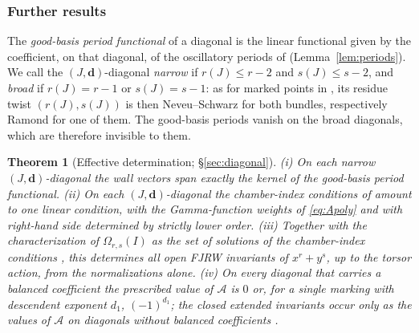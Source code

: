 \documentclass[11pt]{amsart}
\newtheorem{theorem}{Theorem}[section]
\theoremstyle{definition}
\theoremstyle{remark}
\newcommand{\Ascr}{\mathcal{A}}
\newcommand{\Om}{\Omega_{r,s}}
\begin{document}
\subsubsection*{Further results}
The \emph{good-basis period functional} of a diagonal is the linear functional
given by the coefficient, on that diagonal, of the oscillatory periods of
\cite[Thm.~0.3]{GKT} (Lemma~\ref{lem:periods}).  We call the
$(J,\mathbf d)$-diagonal \emph{narrow} if $r(J)\le r-2$ and $s(J)\le s-2$, and
\emph{broad} if $r(J)=r-1$ or $s(J)=s-1$: as for marked points in
\cite[\S1.1]{GKT}, its residue twist $(r(J),s(J))$ is then Neveu--Schwarz for
both bundles, respectively Ramond for one of them.  The good-basis periods
vanish on the broad diagonals, which are therefore invisible to them.

\begin{theorem}[Effective determination; \S\ref{sec:diagonal}]
\label{thm:effective}
(i) On each narrow $(J,\mathbf d)$-diagonal the wall vectors span exactly
the kernel of the good-basis period functional.  (ii) On each
$(J,\mathbf d)$-diagonal the chamber-index conditions of \cite{GKT} amount to
one linear condition, with the Gamma-function weights of \eqref{eq:Apoly} and
with right-hand side determined by strictly lower order.  (iii) Together with
the characterization of $\Om(I)$ as the set of solutions of the chamber-index
conditions \cite[Cor.~5.14]{GKT}, this determines all open FJRW invariants of
$x^{r}+y^{s}$, up to the torsor action, from the normalizations alone.  (iv) On
every diagonal that carries a balanced coefficient the prescribed value of
$\Ascr$ is $0$ or, for a single marking with descendent exponent $d_1$,
$(-1)^{d_1}$; the closed extended invariants occur only as the values of
$\Ascr$ on diagonals without balanced coefficients \cite[Cor.~5.11(3)]{GKT}.
\end{theorem}
\end{document}
